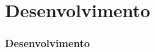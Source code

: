 \section{Desenvolvimento}
\begin{frame}
\frametitle{Desenvolvimento}
\label{desenvolvimento}

\end{frame}